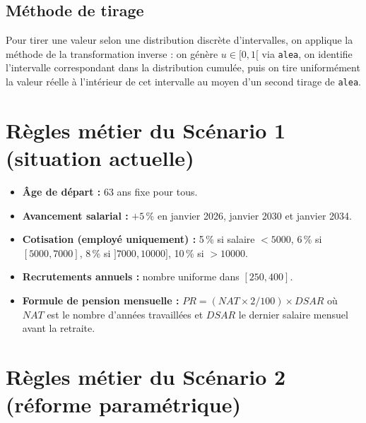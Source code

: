 \documentclass[12pt,a4paper,oneside]{report}
\newcommand{\code}[1]{\texttt{\color{primary}#1}}
\begin{document}
\subsection{Méthode de tirage}

Pour tirer une valeur selon une distribution discrète d'intervalles, on
applique la méthode de la transformation inverse : on génère $u \in [0,1[$
via \code{alea}, on identifie l'intervalle correspondant dans la
distribution cumulée, puis on tire uniformément la valeur réelle à
l'intérieur de cet intervalle au moyen d'un second tirage de \code{alea}.

\section{Règles métier du Scénario 1 (situation actuelle)}

\begin{itemize}
  \item \textbf{Âge de départ :} 63 ans fixe pour tous.
  \item \textbf{Avancement salarial :} $+5\,\%$ en janvier 2026,
        janvier 2030 et janvier 2034.
  \item \textbf{Cotisation (employé uniquement) :}
        5\,\% si salaire $< 5000$, 6\,\% si $[5000, 7000]$,
        8\,\% si $]7000, 10000]$, 10\,\% si $> 10000$.
  \item \textbf{Recrutements annuels :} nombre uniforme dans $[250, 400]$.
  \item \textbf{Formule de pension mensuelle :}
        $PR = (NAT \times 2/100) \times DSAR$ où $NAT$ est le nombre
        d'années travaillées et $DSAR$ le dernier salaire mensuel avant
        la retraite.
\end{itemize}

\section{Règles métier du Scénario 2 (réforme paramétrique)}
\end{document}
